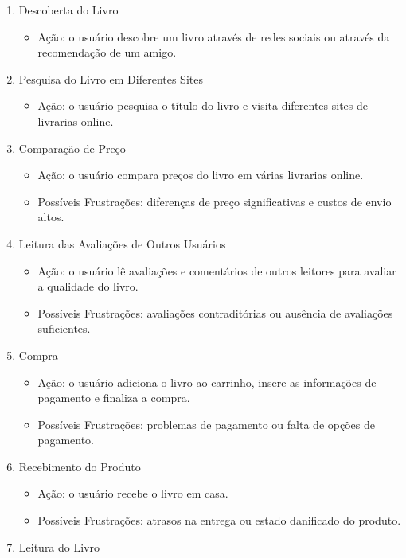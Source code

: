 \documentclass[
  12pt,
  openright,
  twoside,
  a4paper,
  english,
  french,
  spanish,
  brazil
]{abntex2}
\begin{document}
\begin{enumerate}
  \item Descoberta do Livro
  \begin{itemize}
    \item
      Ação: o usuário descobre um livro através de redes sociais ou através da
      recomendação de um amigo.
  \end{itemize}
  \item Pesquisa do Livro em Diferentes Sites
  \begin{itemize}
    \item
      Ação: o usuário pesquisa o título do livro e visita diferentes sites de
      livrarias online.
  \end{itemize}
  \item Comparação de Preço
  \begin{itemize}
    \item Ação: o usuário compara preços do livro em várias livrarias online.
    \item
      Possíveis Frustrações: diferenças de preço significativas e custos de
      envio altos.
  \end{itemize}
  \item Leitura das Avaliações de Outros Usuários
  \begin{itemize}
    \item
      Ação: o usuário lê avaliações e comentários de outros leitores para
      avaliar a qualidade do livro.
    \item
      Possíveis Frustrações: avaliações contraditórias ou ausência de avaliações
      suficientes.
  \end{itemize}
  \item Compra
  \begin{itemize}
    \item
      Ação: o usuário adiciona o livro ao carrinho, insere as informações de
      pagamento e finaliza a compra.
    \item
      Possíveis Frustrações: problemas de pagamento ou falta de opções de
      pagamento.
  \end{itemize}
  \item Recebimento do Produto
  \begin{itemize}
    \item Ação: o usuário recebe o livro em casa.
    \item
      Possíveis Frustrações: atrasos na entrega ou estado danificado do produto.
  \end{itemize}
  \item Leitura do Livro

\end{enumerate}
\end{document}

